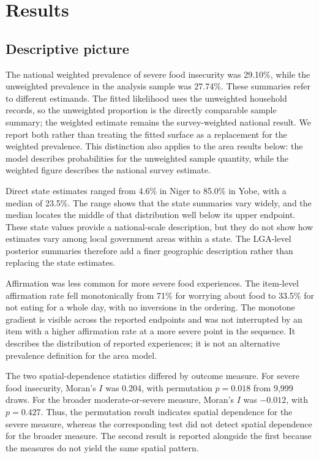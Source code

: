 \section{Results}

\subsection{Descriptive picture}

The national weighted prevalence of severe food insecurity was 29.10\%, while the unweighted prevalence in the analysis sample was 27.74\%. These summaries refer to different estimands. The fitted likelihood uses the unweighted household records, so the unweighted proportion is the directly comparable sample summary; the weighted estimate remains the survey-weighted national result. We report both rather than treating the fitted surface as a replacement for the weighted prevalence. This distinction also applies to the area results below: the model describes probabilities for the unweighted sample quantity, while the weighted figure describes the national survey estimate.

Direct state estimates ranged from 4.6\% in Niger to 85.0\% in Yobe, with a median of 23.5\%. The range shows that the state summaries vary widely, and the median locates the middle of that distribution well below its upper endpoint. These state values provide a national-scale description, but they do not show how estimates vary among local government areas within a state. The LGA-level posterior summaries therefore add a finer geographic description rather than replacing the state estimates.

Affirmation was less common for more severe food experiences. The item-level affirmation rate fell monotonically from 71\% for worrying about food to 33.5\% for not eating for a whole day, with no inversions in the ordering. The monotone gradient is visible across the reported endpoints and was not interrupted by an item with a higher affirmation rate at a more severe point in the sequence. It describes the distribution of reported experiences; it is not an alternative prevalence definition for the area model.

The two spatial-dependence statistics differed by outcome measure. For severe food insecurity, Moran's \(I\) was 0.204, with permutation \(p=0.018\) from 9,999 draws. For the broader moderate-or-severe measure, Moran's \(I\) was \(-0.012\), with \(p=0.427\). Thus, the permutation result indicates spatial dependence for the severe measure, whereas the corresponding test did not detect spatial dependence for the broader measure. The second result is reported alongside the first because the measures do not yield the same spatial pattern.

